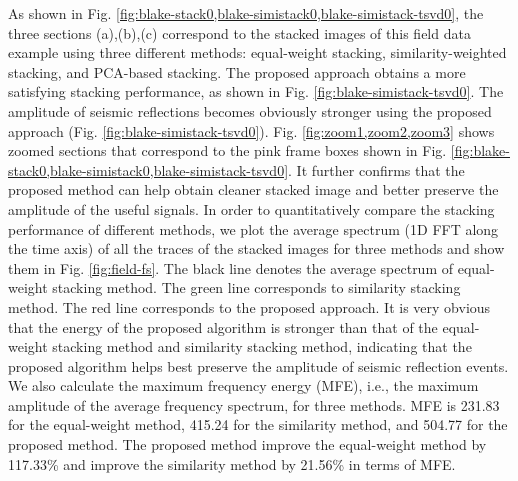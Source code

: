 As shown in Fig. \ref{fig:blake-stack0,blake-simistack0,blake-simistack-tsvd0}, the three sections (a),(b),(c) correspond to the stacked images of this field data example using three different methods: equal-weight stacking, similarity-weighted stacking, and PCA-based stacking. The proposed approach obtains a more satisfying stacking performance, as shown in Fig. \ref{fig:blake-simistack-tsvd0}. The amplitude of seismic reflections becomes obviously stronger using the proposed approach (Fig. \ref{fig:blake-simistack-tsvd0}). Fig. \ref{fig:zoom1,zoom2,zoom3} shows zoomed sections that correspond to the pink frame boxes shown in Fig. \ref{fig:blake-stack0,blake-simistack0,blake-simistack-tsvd0}. It further confirms that the proposed method can help obtain cleaner stacked image and better preserve the amplitude of the useful signals. In order to quantitatively compare the stacking performance of different methods, we plot the average spectrum (1D FFT along the time axis) of all the traces of the stacked images for three methods and show them in Fig. \ref{fig:field-fs}. The black line denotes the average spectrum of equal-weight stacking method. The green line corresponds to similarity stacking method. The red line corresponds to the proposed approach. It is very obvious that the energy of the proposed algorithm is stronger than that of the equal-weight stacking method and similarity stacking method, indicating that the proposed algorithm helps best preserve the amplitude of seismic reflection events. We also calculate the maximum frequency energy (MFE), i.e., the maximum amplitude of the average frequency spectrum, for three methods. MFE is 231.83 for the equal-weight method, 415.24 for the similarity method, and 504.77 for the proposed method. The proposed method improve the equal-weight method by 117.33\% and improve the similarity method by 21.56\% in terms of MFE. 


